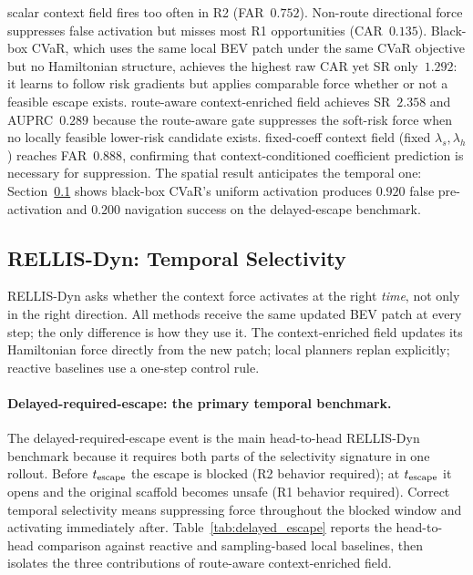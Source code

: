 scalar context field fires too often in R2 (FAR~$0.752$). Non-route
directional force suppresses false activation but misses most R1
opportunities (CAR~$0.135$). Black-box CVaR, which uses the same
local BEV patch under the same CVaR objective but no Hamiltonian
structure, achieves the highest raw CAR yet SR only~$1.292$: it learns
to follow risk gradients but applies comparable force whether or not a
feasible escape exists. route-aware context-enriched field achieves SR~$2.358$ and
AUPRC~$0.289$ because the route-aware gate suppresses the soft-risk
force when no locally feasible lower-risk candidate exists.
fixed-coeff context field (fixed $\lambda_s,\lambda_h$) reaches
FAR~$0.888$, confirming that context-conditioned coefficient prediction
is necessary for suppression.
The spatial result anticipates the temporal one: Section~\ref{sec:exp_rellis_dyn}
shows black-box CVaR's uniform activation produces $0.920$ false
pre-activation and $0.200$ navigation success on the delayed-escape
benchmark.

\subsection{RELLIS-Dyn: Temporal Selectivity}
\label{sec:exp_rellis_dyn}

RELLIS-Dyn asks whether the context force activates at the right
\emph{time}, not only in the right direction.
All methods receive the same updated BEV patch at every step; the only
difference is how they use it.
The context-enriched field updates its Hamiltonian force directly from the new patch;
local planners replan explicitly; reactive baselines use a one-step
control rule.

\paragraph{Delayed-required-escape: the primary temporal benchmark.}

The delayed-required-escape event is the main head-to-head RELLIS-Dyn
benchmark because it requires both parts of the selectivity signature in
one rollout.
Before $t_{\rm escape}$ the escape is blocked (R2 behavior required);
at $t_{\rm escape}$ it opens and the original scaffold becomes
unsafe (R1 behavior required).
Correct temporal selectivity means suppressing force throughout the
blocked window and activating immediately after.
Table~\ref{tab:delayed_escape} reports the head-to-head comparison
against reactive and sampling-based local baselines, then isolates the
three contributions of route-aware context-enriched field.

